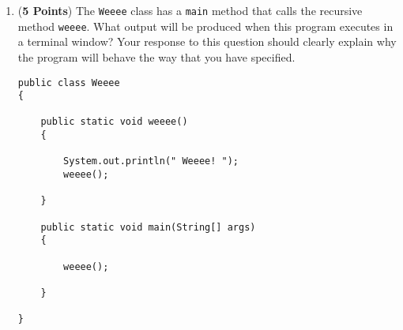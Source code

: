 \documentclass[12pt]{article}
\begin{document}
\begin{enumerate}
\begin{enumerate}
\item ({\bf 5 Points}) The {\tt Weeee} class has a {\tt main} method
  that calls the recursive method {\tt weeee}.  What output will be
  produced when this program executes in a terminal window?  Your
  response to this question should clearly explain why the program
  will behave the way that you have specified.

\begin{verbatim}
public class Weeee
{

    public static void weeee()
    {

        System.out.println(" Weeee! ");
        weeee();

    }

    public static void main(String[] args)
    {

        weeee();

    }

}
\end{verbatim}







\end{enumerate}
\end{enumerate}
\end{document}
